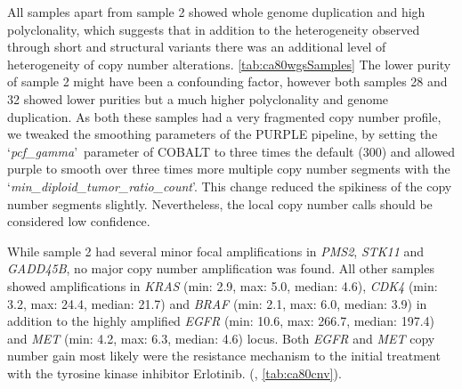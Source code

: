 All samples apart from sample 2 showed whole genome duplication and high polyclonality, which suggests that in addition to the heterogeneity observed through short and structural variants there was an additional level of heterogeneity of copy number alterations. \autoref{tab:ca80wgsSamples}  The lower purity of sample 2 might have been a confounding factor, however both samples 28 and 32 showed lower purities but a much higher polyclonality and genome duplication.  As both these samples had a very fragmented copy number profile, we tweaked the smoothing parameters of the PURPLE pipeline, by setting the \lq\textit{pcf\_gamma}\rq\ parameter of COBALT to three times the default (300) and allowed purple to smooth over three times more multiple copy number segments with the \lq\textit{min\_diploid\_tumor\_ratio\_count}\rq. This change reduced the spikiness of the copy number segments slightly. Nevertheless, the local copy number calls should be considered low confidence.

While sample 2 had several minor focal amplifications in \textit{PMS2}, \textit{STK11} and \textit{GADD45B}, no major copy number amplification was found. All other samples showed amplifications in \textit{KRAS} (min: 2.9, max: 5.0, median: 4.6), \textit{CDK4} (min: 3.2, max: 24.4, median: 21.7) and \textit{BRAF} (min: 2.1, max: 6.0, median: 3.9) in addition to the highly amplified \textit{EGFR} (min: 10.6, max: 266.7, median: 197.4) and \textit{MET} (min: 4.2, max: 6.3, median: 4.6) locus. Both \textit{EGFR} and \textit{MET} copy number gain most likely were the resistance mechanism to the initial treatment with the tyrosine kinase inhibitor Erlotinib. (, \autoref{tab:ca80cnv}).


